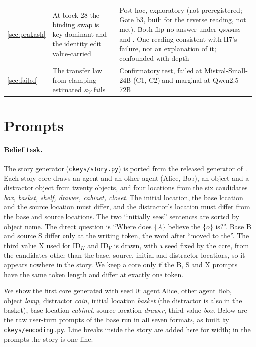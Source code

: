 \begin{table}[p]
\begin{tabular}{p{}p{}p{}}
\cref{sec:prakash} & At block 28 the binding swap is key-dominant and the identity edit value-carried & Post hoc, exploratory (not preregistered; Gate b3, built for the reverse reading, not met). Both flip no answer under \textsc{qnames} and \fmtOpt{}. One reading consistent with H7's failure, not an explanation of it; confounded with depth \\
\cref{sec:failed} & The transfer law from clamping-estimated $\kappa_V$ fails & Confirmatory test, failed at Mistral-Small-24B (C1, C2) and marginal at Qwen2.5-72B \\
\bottomrule
\end{tabular}
\end{table}

\clearpage
\section{Prompts}\label{app:prompts}

\paragraph{Belief task.} The story generator (\texttt{ckeys/story.py}) is ported from the released generator of \citet{anonymous2026fitted}. Each story core draws an agent and an other agent (Alice, Bob), an object and a distractor object from twenty objects, and four locations from the six candidates \emph{box, basket, shelf, drawer, cabinet, closet}. The initial location, the base location and the source location must differ, and the distractor's location must differ from the base and source locations. The two ``initially sees'' sentences are sorted by object name. The direct question is ``Where does \{$A$\} believe the \{$o$\} is?''. Base B and source S differ only at the writing token, the word after ``moved to the''. The third value X used for $\mathrm{ID}_K$ and $\mathrm{ID}_V$ is drawn, with a seed fixed by the core, from the candidates other than the base, source, initial and distractor locations, so it appears nowhere in the story. We keep a core only if the B, S and X prompts have the same token length and differ at exactly one token.

We show the first core generated with seed 0: agent Alice, other agent Bob, object \emph{lamp}, distractor \emph{coin}, initial location \emph{basket} (the distractor is also in the basket), base location \emph{cabinet}, source location \emph{drawer}, third value \emph{box}. Below are the raw user-turn prompts of the base run in all seven formats, as built by \texttt{ckeys/encoding.py}. Line breaks inside the story are added here for width; in the prompts the story is one line.

